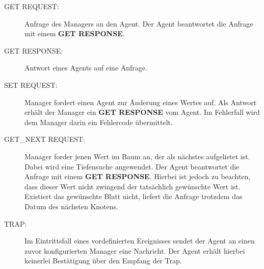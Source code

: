 \begin{description}
  \item[GET REQUEST:] Anfrage des Managers an den Agent. Der Agent beantwortet die Anfrage mit einem \textbf{GET RESPONSE}.
  \item[GET RESPONSE:] Antwort eines Agents auf eine Anfrage.
  \item[SET REQUEST:] Manager fordert einen Agent zur Änderung eines Wertes auf. Als Antwort erhält der Manager ein \textbf{GET RESPONSE} vom Agent. Im Fehlerfall wird dem Manager darin ein Fehlercode übermittelt.
  \item[GET\_NEXT REQUEST:] Manager forder jenen Wert im Baum an, der als nächstes aufgelistet ist. Dabei wird eine Tiefensuche angewendet. Der Agent beantwortet die Anfrage mit einem \textbf{GET RESPONSE}. Hierbei ist jedoch zu beachten, dass dieser Wert nicht zwingend der tatsächlich gewünschte Wert ist. Existiert das gewünschte Blatt nicht, liefert die Anfrage trotzdem das Datum des nächsten Knotens.
  \item[TRAP:] Im Eintrittsfall eines vordefinierten Ereignisses sendet der Agent an einen zuvor konfigurierten Manager eine Nachricht. Der Agent erhält hierbei keinerlei Bestätigung über den Empfang der Trap.
\end{description}

